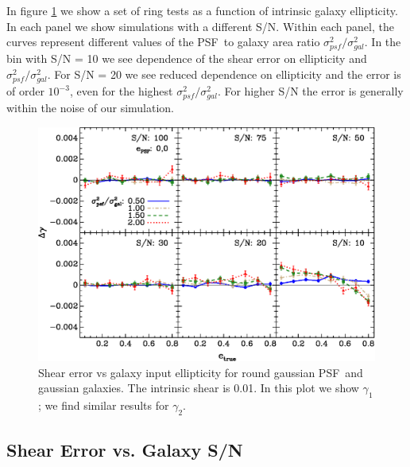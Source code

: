 \documentclass[10pt,preprint]{aastex}
\newcommand{\aratio}{\ensuremath{\sigma^2_{psf}/\sigma^2_{gal}}}
\newcommand{\psf}{PSF}
\newcommand{\Rshear}{\ensuremath{\mathcal{R}}}
\newcommand{\rfracerr}{\ensuremath{\Delta \Rshear/\Rshear}}
\begin{document}
In figure \ref{fig:set-e-gg02} we show a set of ring tests as a function of
intrinsic galaxy ellipticity.  In each panel we show simulations with a
different S/N.  Within each panel, the curves represent different values of the
\psf\ to galaxy area ratio \aratio.  In the bin with S/N = 10 we see dependence
of the shear error on ellipticity and \aratio.  For S/N = 20 we see reduced
dependence on ellipticity and the error is of order $10^{-3}$, even for the
highest \aratio.  For higher S/N the error is generally within the noise of our
simulation.

\begin{figure}[t] \centering
 \centering 
 \includegraphics[scale=1]{figures/set-e-gg02-yr-0.005-0.005-vs-e.eps}

 \caption{Shear error vs galaxy input ellipticity for round gaussian \psf\ and
 gaussian galaxies. The intrinsic shear is 0.01.  In this plot we show
 $\gamma_1$; we find similar results for $\gamma_2$.  \label{fig:set-e-gg02}}

\end{figure}



\subsection{Shear Error vs. Galaxy S/N}
\end{document}
